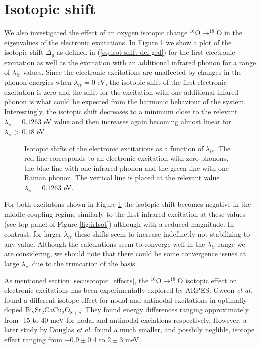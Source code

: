 \section{Isotopic shift}
\label{sec:elIsotShift}

We also investigated the effect of an oxygen isotopic change $^{16}$O$\rightarrow ^{18}$O in the eigenvalues of the electronic excitations.
In Figure \ref{fig:electrIsot} we show a plot of the isotopic shift $\Delta_g$ as defined in (\ref{eq:isot-shift-def-grd}) for the first electronic excitation as well as the excitation with an additional infrared phonon for a range of $\lambda_{ir}$ values.
Since the electronic excitations are unaffected by changes in the phonon energies when $\lambda_{ir}=0$ eV, the isotopic shift of the first electronic excitation is zero and the shift for the excitation with one additional infared phonon is what could be expected from the harmonic behaviour of the system.
Interestingly, the isotopic shift decreases to a minimum close to the relevant $\lambda_{ir}=0.1263$ eV value and then increases again becoming almost linear for $\lambda_{ir}>0.18$ eV \cite{GarciaSaraviaOrtizdeMontellano2014}.
%
\begin{figure}[ht]
  \centering
  
  \caption[Isotopic shift of the electronic excitations as a function of $\lambda_{ir}$.]
  {Isotopic shifts of the electronic excitations as a function of $\lambda_{ir}$. 
    The red line corresponds to an electronic excitation with zero phonons, the blue line with one infrared phonon and the green line with one Raman phonon.
    The vertical line is placed at the relevant value $\lambda_{ir}=0.1263$ eV.}
  \label{fig:electrIsot}
\end{figure}

For both excitatons shown in Figure \ref{fig:electrIsot} the isotopic shift becomes negative in the middle coupling regime similarly to the first infrared excitation at these values (see top panel of Figure \ref{fig:irIsot}) although with a reduced magnitude.
In contrast, for larger $\lambda_{ir}$ these shifts seem to increase indefinetly not stabilizing to any value.
Although the calculations seem to converge well in the $\lambda_{ir}$ range we are considering, we should note that there could be some convergence issues at large $\lambda_{ir}$ due to the truncation of the basis.

As mentioned section \ref{sec:isotopic_effects}, the $^{16}$O$\rightarrow ^{18}$O isotopic effect on electronic excitations has been experimentally explored by ARPES.
Gweon \emph{et al.\/} \cite{Gweon2004} found a different isotope effect for nodal and antinodal excitations in optimally doped Bi$_2$Sr$_2$CaCu$_2$O$_{8+\delta}$. 
They found energy differences ranging approximately from -15 to 40 meV for nodal and antinodal exciations respectively.
However, a later study by Douglas \emph{et al.\/} \cite{Douglas2007} found a much smaller, and possbily neglible, isotope effect ranging from $-0.9\pm 0.4$ to $2 \pm 3$ meV.

